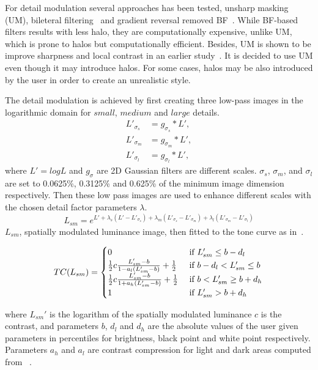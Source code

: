 For detail modulation several approaches has been tested, unsharp masking (UM), bileteral filtering~\cite{Tomasi98} and gradient reversal removed BF~\cite{Bae2006}. While BF-based filters results with less halo, they are computationally expensive, unlike UM, which is prone to halos but computationally efficient. Besides, UM is shown to be improve sharpness and local contrast in an earlier study~\cite{Trenta2012}. It is decided to use UM even though it may introduce halos. For some cases, halos may be also introduced by the user in order to create an unrealistic style.

The detail modulation is achieved by first creating three low-pass images in the logarithmic domain for $small$, $medium$ and $large$ details.
\begin{align}
L'_{\sigma_s} &= g _{\sigma_s} * L', \\
L'_{\sigma_m} &= g _{\sigma_m} * L', \\
L'_{\sigma_l} &= g _{\sigma_l} * L', 
\end{align}
where $L' = log L$ and $g_\sigma$ are 2D Gaussian filters are different scales. $\sigma_s$, $\sigma_m$, and $\sigma_l$ are set to 0.0625\%, 0.3125\% and 0.625\% of the minimum image dimension respectively. Then these low pass images are used to enhance different scales with the chosen detail factor parameters $\lambda$.
\begin{equation}
    L_{sm} = e^{L' + \lambda_s(L' - L'_{\sigma_s}) + \lambda_m(L'_{\sigma_s} - L'_{\sigma_m}) + \lambda_l(L'_{\sigma_m} - L'_{\sigma_l})}
\end{equation}
$L_{sm}$, spatially modulated luminance image, then fitted to the tone curve as in~\cite{mantiuk2008modeling}. 

\begin{equation}
    TC(L_{sm}) = 
    \begin{cases}
    0 &\text{  if  $L_{sm}' \leq b - d_l$ } \\
    \frac{1}{2}c {{L_{sm}' - b}\over{1 - a_l(L_{sm}'-b)}} + \frac{1}{2} &\text{ if $b - d_l < L_{sm}' \leq b $ } \\ 
    \frac{1}{2}c {{L_{sm}' - b}\over{1 + a_h(L_{sm}'-b)}} + \frac{1}{2} &\text{ if $b < L_{sm}' \geq b + d_h$} \\ 
    1 &\text{ if  $L_{sm}' > b + d_h$}
    \end{cases}
\end{equation}

where $L_{sm}'$ is the logarithm of the spatially modulated luminance $c$ is the contrast, and parameters $b$, $d_l$ and $d_h$ are the absolute values of the user given parameters in percentiles for brightness, black point and white point respectively. Parameters $a_h$ and $a_l$ are contrast compression for light and dark areas computed from ~\cite{mantiuk2008modeling}.

